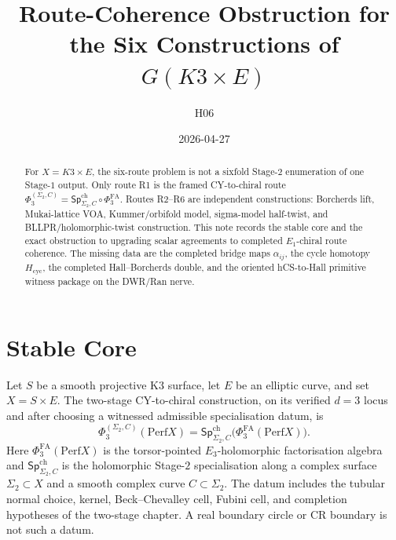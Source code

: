 \documentclass[11pt]{amsart}
\title{Route-Coherence Obstruction for the Six Constructions of $G(K3\times E)$}
\author{H06}
\date{2026-04-27}
\theoremstyle{plain}
\theoremstyle{definition}
\theoremstyle{remark}
\providecommand{\Perf}{\mathrm{Perf}}
\providecommand{\Eone}{E_1}
\providecommand{\Ethree}{E_3}
\providecommand{\PhiFA}{\Phi^{\mathrm{FA}}}
\providecommand{\SpCh}{\mathsf{Sp}^{\mathrm{ch}}}
\begin{document}
\begin{abstract}
For $X=K3\times E$, the six-route problem is not a sixfold Stage-$2$
enumeration of one Stage-$1$ output.  Only route R1 is the framed
CY-to-chiral route
$\Phi_3^{(\Sigma_2,C)}=\SpCh_{\Sigma_2,C}\circ\PhiFA_3$.  Routes
R2--R6 are independent constructions: Borcherds lift, Mukai-lattice
VOA, Kummer/orbifold model, sigma-model half-twist, and
BLLPR/holomorphic-twist construction.  This note records the stable
core and the exact obstruction to upgrading scalar agreements to
completed $\Eone$-chiral route coherence.  The missing data are the
completed bridge maps $\alpha_{ij}$, the cycle homotopy
$H_{\mathrm{cyc}}$, the completed Hall--Borcherds double, and the
oriented hCS-to-Hall primitive witness package on the DWR/Ran nerve.
\end{abstract}

\maketitle

\tableofcontents

\section{Stable Core}
\label{sec:stable-core}

Let $S$ be a smooth projective K3 surface, let $E$ be an elliptic curve,
and set $X=S\times E$.  The two-stage CY-to-chiral construction, on its
verified $d=3$ locus and after choosing a witnessed admissible
specialisation datum, is
\begin{equation}
\label{eq:two-stage}
 \Phi_3^{(\Sigma_2,C)}(\Perf X)
 =
 \SpCh_{\Sigma_2,C}\bigl(\PhiFA_3(\Perf X)\bigr).
\end{equation}
Here $\PhiFA_3(\Perf X)$ is the torsor-pointed $\Ethree$-holomorphic
factorisation algebra and $\SpCh_{\Sigma_2,C}$ is the holomorphic
Stage-$2$ specialisation along a complex surface $\Sigma_2\subset X$ and
a smooth complex curve $C\subset \Sigma_2$.  The datum includes the
tubular normal choice, kernel, Beck--Chevalley cell, Fubini cell, and
completion hypotheses of the two-stage chapter.  A real boundary circle
or CR boundary is not such a datum.
\end{document}
